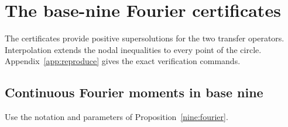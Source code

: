 \documentclass[11pt,a4paper]{article}
\theoremstyle{paperplain}
\numberwithin{equation}{section}
\begin{document}
\section{The base-nine Fourier certificates}
\label{app:small-certificates}

The certificates provide positive supersolutions for the two transfer
operators. Interpolation extends the nodal inequalities to every
point of the circle. Appendix~\ref{app:reproduce} gives the exact
verification commands.

\subsection{Continuous Fourier moments in base nine}
\label{app:nine-moments}

Use the notation and parameters of Proposition~\ref{nine:fourier}.
\end{document}
